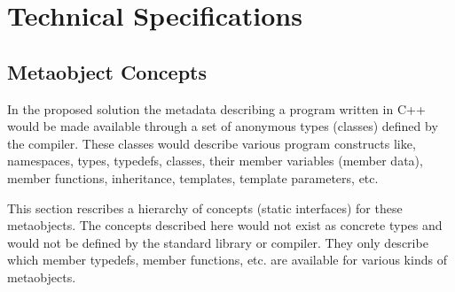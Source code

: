 \section{Technical Specifications}

\subsection{Metaobject Concepts}

In the proposed solution the metadata describing a program written
in C++ would be made available through a set of anonymous types (classes)
defined by the compiler. These classes would describe various program
constructs like, namespaces, types, typedefs, classes, their member variables
(member data), member functions, inheritance, templates, template parameters,
etc.

This section rescribes a hierarchy of concepts (static interfaces) for these
metaobjects. The concepts described here would not exist as concrete
types and would not be defined by the standard library or compiler. They
only describe which member typedefs, member functions, etc. are available
for various kinds of metaobjects.
